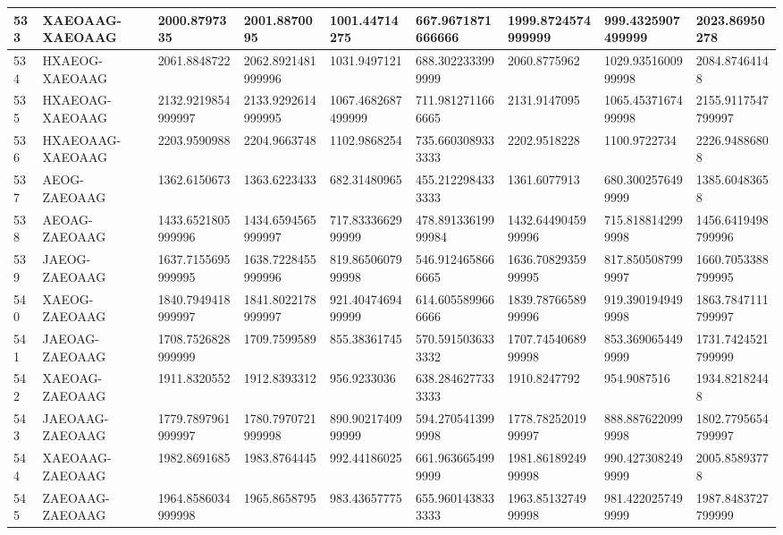 {\begin{longtable}{|l|l|l|l|l|l|l|l|l|}
        533 & XAEOAAG-XAEOAAG & 2000.8797335 & 2001.8870095 & 1001.44714275 & 667.9671871666666 & 1999.8724574999999 & 999.4325907499999 & 2023.86950278 \\ \hline
        534 & HXAEOG-XAEOAAG & 2061.8848722 & 2062.8921481999996 & 1031.9497121 & 688.3022333999999 & 2060.8775962 & 1029.9351600999998 & 2084.87464148 \\ \hline
        535 & HXAEOAG-XAEOAAG & 2132.9219854999997 & 2133.9292614999995 & 1067.4682687499999 & 711.9812711666665 & 2131.9147095 & 1065.4537167499998 & 2155.9117547799997 \\ \hline
        536 & HXAEOAAG-XAEOAAG & 2203.9590988 & 2204.9663748 & 1102.9868254 & 735.6603089333333 & 2202.9518228 & 1100.9722734 & 2226.94886808 \\ \hline
        537 & AEOG-ZAEOAAG & 1362.6150673 & 1363.6223433 & 682.31480965 & 455.2122984333333 & 1361.6077913 & 680.3002576499999 & 1385.60483658 \\ \hline
        538 & AEOAG-ZAEOAAG & 1433.6521805999996 & 1434.6594565999997 & 717.8333662999999 & 478.89133619999984 & 1432.6449045999996 & 715.8188142999998 & 1456.6419498799996 \\ \hline
        539 & JAEOG-ZAEOAAG & 1637.7155695999995 & 1638.7228455999996 & 819.8650607999998 & 546.9124658666665 & 1636.7082935999995 & 817.8505087999997 & 1660.7053388799995 \\ \hline
        540 & XAEOG-ZAEOAAG & 1840.7949418999997 & 1841.8022178999997 & 921.4047469499999 & 614.6055899666666 & 1839.7876658999996 & 919.3901949499998 & 1863.7847111799997 \\ \hline
        541 & JAEOAG-ZAEOAAG & 1708.7526828999999 & 1709.7599589 & 855.38361745 & 570.5915036333332 & 1707.7454068999998 & 853.3690654499999 & 1731.7424521799999 \\ \hline
        542 & XAEOAG-ZAEOAAG & 1911.8320552 & 1912.8393312 & 956.9233036 & 638.2846277333333 & 1910.8247792 & 954.9087516 & 1934.82182448 \\ \hline
        543 & JAEOAAG-ZAEOAAG & 1779.7897961999997 & 1780.7970721999998 & 890.9021740999999 & 594.2705413999998 & 1778.7825201999997 & 888.8876220999998 & 1802.7795654799997 \\ \hline
        544 & XAEOAAG-ZAEOAAG & 1982.8691685 & 1983.8764445 & 992.44186025 & 661.9636654999999 & 1981.8618924999998 & 990.4273082499999 & 2005.85893778 \\ \hline
        545 & ZAEOAAG-ZAEOAAG & 1964.8586034999998 & 1965.8658795 & 983.43657775 & 655.9601438333333 & 1963.8513274999998 & 981.4220257499999 & 1987.8483727799999 \\ \hline

\end{longtable}}
